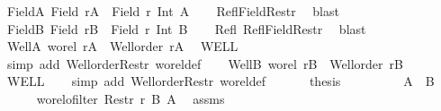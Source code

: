 \begin{isabellebody}
\ FieldA{\isacharcolon}{\kern0pt}\ {\isachardoublequoteopen}Field\ {\isacharquery}{\kern0pt}rA\ {\isacharequal}{\kern0pt}\ Field\ r\ Int\ A{\isachardoublequoteclose}\isanewline
\ \ \isamarkupfalse%
\ Refl{\isacharunderscore}{\kern0pt}Field{\isacharunderscore}{\kern0pt}Restr\ \isamarkupfalse%
\ blast\isanewline
\ \ \isamarkupfalse%
\ FieldB{\isacharcolon}{\kern0pt}\ {\isachardoublequoteopen}Field\ {\isacharquery}{\kern0pt}rB\ {\isacharequal}{\kern0pt}\ Field\ r\ Int\ B{\isachardoublequoteclose}\isanewline
\ \ \isamarkupfalse%
\ Refl\ Refl{\isacharunderscore}{\kern0pt}Field{\isacharunderscore}{\kern0pt}Restr\ \isamarkupfalse%
\ blast\isanewline
\ \ \isamarkupfalse%
\ WellA{\isacharcolon}{\kern0pt}\ {\isachardoublequoteopen}wo{\isacharunderscore}{\kern0pt}rel\ {\isacharquery}{\kern0pt}rA\ {\isasymand}\ Well{\isacharunderscore}{\kern0pt}order\ {\isacharquery}{\kern0pt}rA{\isachardoublequoteclose}\ \isamarkupfalse%
\ WELL\isanewline
\ \ \isamarkupfalse%
\ {\isacharparenleft}{\kern0pt}simp\ add{\isacharcolon}{\kern0pt}\ Well{\isacharunderscore}{\kern0pt}order{\isacharunderscore}{\kern0pt}Restr\ wo{\isacharunderscore}{\kern0pt}rel{\isacharunderscore}{\kern0pt}def{\isacharparenright}{\kern0pt}\isanewline
\ \ \isamarkupfalse%
\ WellB{\isacharcolon}{\kern0pt}\ {\isachardoublequoteopen}wo{\isacharunderscore}{\kern0pt}rel\ {\isacharquery}{\kern0pt}rB\ {\isasymand}\ Well{\isacharunderscore}{\kern0pt}order\ {\isacharquery}{\kern0pt}rB{\isachardoublequoteclose}\ \isamarkupfalse%
\ WELL\isanewline
\ \ \isamarkupfalse%
\ {\isacharparenleft}{\kern0pt}simp\ add{\isacharcolon}{\kern0pt}\ Well{\isacharunderscore}{\kern0pt}order{\isacharunderscore}{\kern0pt}Restr\ wo{\isacharunderscore}{\kern0pt}rel{\isacharunderscore}{\kern0pt}def{\isacharparenright}{\kern0pt}\isanewline
\ \ \isanewline
\ \ \isamarkupfalse%
\ {\isacharquery}{\kern0pt}thesis\isanewline
\ \ \isamarkupfalse%
\isanewline
\ \ \ \ \isamarkupfalse%
\ {\isacharasterisk}{\kern0pt}{\isacharcolon}{\kern0pt}\ {\isachardoublequoteopen}A\ {\isasymle}\ B{\isachardoublequoteclose}\isanewline
\ \ \ \ \isamarkupfalse%
\ {\isachardoublequoteopen}wo{\isacharunderscore}{\kern0pt}rel{\isachardot}{\kern0pt}ofilter\ {\isacharparenleft}{\kern0pt}Restr\ r\ B{\isacharparenright}{\kern0pt}\ A{\isachardoublequoteclose}\ \isamarkupfalse%
\ assms\isanewline
\ \ \ \ \isamarkupfalse%

\end{isabellebody}

